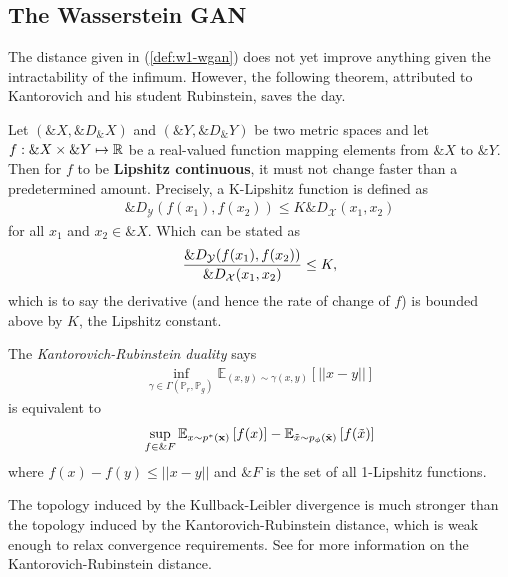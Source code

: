 \subsection{The Wasserstein GAN}

The distance given in (\ref{def:w1-wgan}) does not yet improve
anything given the intractability of the infimum. However, the
following theorem, attributed to Kantorovich and his student
Rubinstein, saves the day.

\begin{definition}
  Let $(\&X, \&D_\&X)$ and $(\&Y, \&D_\&Y)$ be two metric spaces and
  let $f: \&X \times \&Y \mapsto \mathbb{R}$ be a real-valued function mapping
  elements from $\&X$ to $\&Y$. Then for $f$ to be \textbf{Lipshitz
    continuous}, it must not change faster than a predetermined
  amount.  Precisely, a K-Lipshitz function is defined as
  \begin{align}
    \&D_{\mathcal{Y}}(f(x_1), f(x_2)) \leq K{\&D}_{\mathcal{X}}(x_1, x_2)
  \end{align}
  for all $x_1$ and $x_2 \in \&X$. Which can be stated as
  \begin{align}
    {\&D_{\mathcal{Y}}(f(x_1), f(x_2)) \over \&D_{\mathcal{X}}(x_1, x_2)} \leq K,
  \end{align}
  which is to say the derivative (and hence the rate of change of $f$)
  is bounded above by $K$, the Lipshitz constant.
\end{definition}

\begin{theorem} The \textit{Kantorovich-Rubinstein duality} says
  \begin{align}
    \inf_{\gamma \in \Gamma(\mathbb{P}_r,
    \mathbb{P}_g)}\mathbb{E}_{(x,y) \sim \gamma(x, y)} \left[ || x-y
    || \right]
  \end{align}
  is equivalent to
  \begin{align} \sup_{f \in \&{F}} \mathbb{E}_{x \sim p^*(\mathbf{x})}\left[ f(x)
    \right] - \mathbb{E}_{\tilde{x} \sim p_{\phi}(\tilde{\mathbf{x}})}\left[ f(\tilde{x}) \right]
  \end{align}
  where $f(x) - f(y) \leq ||x-y||$ and $\&{F}$ is the set of all
  1-Lipshitz functions.
\end{theorem}

The topology induced by the Kullback-Leibler divergence is much
stronger than the topology induced by the Kantorovich-Rubinstein
distance, which is weak enough to relax convergence requirements. See
\cite{ref:villani-2008} for more information on the
Kantorovich-Rubinstein distance.

